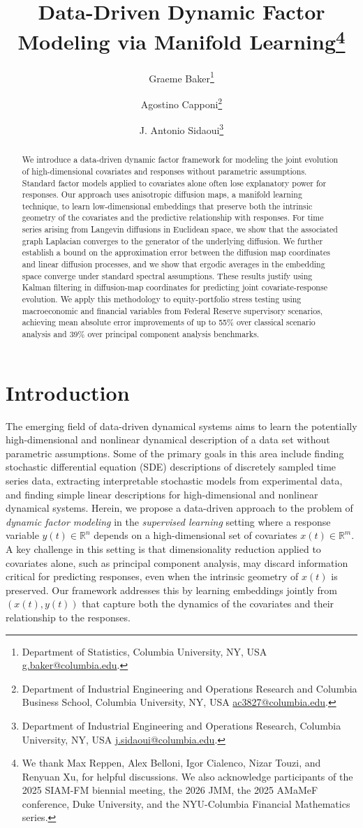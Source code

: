 \documentclass[11pt]{article}
\title{Data-Driven Dynamic Factor Modeling via Manifold Learning\footnote{
We thank Max Reppen, Alex Belloni, Igor Cialenco,  Nizar Touzi, and Renyuan Xu, for helpful discussions. We also acknowledge participants of the 2025 SIAM-FM biennial meeting, the 2026 JMM, the 2025 AMaMeF conference, Duke University, and the NYU-Columbia Financial Mathematics series.}}
\author{Graeme Baker\thanks{Department of Statistics, Columbia University, NY, USA \href{mailto:g.baker@columbia.edu}{g.baker@columbia.edu}.}\and 
    Agostino Capponi\thanks{Department of Industrial Engineering and Operations Research and Columbia Business School, Columbia University, NY, USA \href{mailto:ac3827@columbia.edu}{ac3827@columbia.edu}.}\and 
     J. Antonio Sidaoui\thanks{Department of Industrial Engineering and Operations Research, Columbia University, NY, USA \href{mailto:j.sidaoui@columbia.edu}{j.sidaoui@columbia.edu}.}}
\date{}
\theoremstyle{plain}
\theoremstyle{definition}
\theoremstyle{remark}
\numberwithin{equation}{section}
\begin{document}
\maketitle

\begin{abstract}
We introduce a data-driven dynamic factor framework for modeling the joint evolution of high-dimensional covariates and responses without parametric assumptions. Standard factor models applied to covariates alone often lose explanatory power for responses. Our approach uses anisotropic diffusion maps, a manifold learning technique, to learn low-dimensional embeddings that preserve both the intrinsic geometry of the covariates and the predictive relationship with responses. For time series arising from Langevin diffusions in Euclidean space, we show that the associated graph Laplacian converges to the generator of the underlying diffusion. We further establish a bound on the approximation error between the diffusion map coordinates and linear diffusion processes, and we show that ergodic averages in the embedding space converge under standard spectral assumptions. These results justify using Kalman filtering in diffusion-map coordinates for predicting joint covariate-response evolution. We apply this methodology to equity-portfolio stress testing using macroeconomic and financial variables from Federal Reserve supervisory scenarios, achieving mean absolute error improvements of up to 55\% over classical scenario analysis and 39\% over principal component analysis  benchmarks.
\end{abstract}

\section{Introduction}

The emerging field of data-driven dynamical systems aims to learn the potentially high-dimensional and nonlinear dynamical description of a data set without parametric assumptions. Some of the primary goals in this area include finding stochastic differential equation (SDE) descriptions of discretely sampled time series data, extracting interpretable stochastic models from experimental data, and finding simple linear descriptions for high-dimensional and nonlinear dynamical systems. 
Herein, we propose a data-driven approach to the problem of \emph{dynamic factor modeling} in the \emph{supervised learning} setting where a response variable $y(t) \in \mathbb{R}^n$ depends on a high-dimensional set of covariates $x(t) \in \mathbb{R}^m$. A key challenge in this setting is that dimensionality reduction applied to covariates alone, such as principal component analysis, may discard information critical for predicting responses, even when the intrinsic geometry of $x(t)$ is preserved. Our framework addresses this by learning embeddings jointly from $(x(t), y(t))$ that capture both the dynamics of the covariates and their relationship to the responses.
\end{document}
